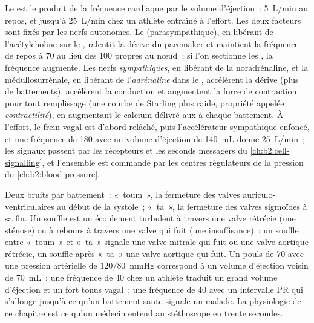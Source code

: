 \begin{proposition}\label{prop:b2:heart:control}
Le  est le produit de la fréquence cardiaque par le
volume d'éjection~: \qty{5}{L/min} au repos, et jusqu'à \qty{25}{L/min}
chez un athlète entraîné à l'effort. Les deux facteurs sont fixés par
les nerfs autonomes. Le \emph{} (parasympathique), en libérant
de l'acétylcholine sur le , ralentit la dérive du
pacemaker et maintient la fréquence de repos à 70 au lieu des 100
propres au nœud~; si l'on sectionne les , la fréquence
augmente. Les nerfs \emph{sympathiques}, en libérant de la
noradrénaline, et la médullosurrénale, en libérant de
l'\emph{adrénaline} dans le , accélèrent la dérive (plus de
battements), accélèrent la conduction et augmentent la force de
contraction pour tout remplissage (une courbe de Starling plus raide,
propriété appelée \emph{contractilité}), en augmentant le calcium
délivré aux  à chaque battement. À l'effort, le frein vagal
est d'abord relâché, puis l'accélérateur sympathique enfoncé, et une
fréquence de 180 avec un volume d'éjection de \qty{140}{mL} donne
\qty{25}{L/min}~; les signaux passent par les récepteurs et les seconds
messagers du \cref{ch:b2:cell-signalling}, et l'ensemble est commandé par
les centres régulateurs de la pression du
\cref{ch:b2:blood-pressure}.
\end{proposition}

\begin{example}\label{ex:b2:heart:reading}
Deux bruits par battement~: «~toum~», la fermeture des valves
auriculo-ventriculaires au début de la systole~; «~ta~», la fermeture des
valves sigmoïdes à sa fin. Un souffle est un écoulement turbulent à
travers une valve rétrécie (une sténose) ou à rebours à travers une valve
qui fuit (une insuffisance)~: un souffle entre «~toum~» et «~ta~»
signale une valve mitrale qui fuit ou une valve aortique rétrécie, un
souffle après «~ta~» une valve aortique qui fuit. Un pouls de 70 avec une
pression artérielle de
$120/80$~mmHg correspond à un volume d'éjection voisin de \qty{70}{mL}~;
une fréquence de 40 chez un athlète traduit un grand volume d'éjection et
un fort tonus vagal~; une fréquence de 40 avec un intervalle PR qui
s'allonge jusqu'à ce qu'un battement saute signale un  malade. La physiologie de ce chapitre est ce qu'un
médecin entend au stéthoscope en trente secondes.
\end{example}

